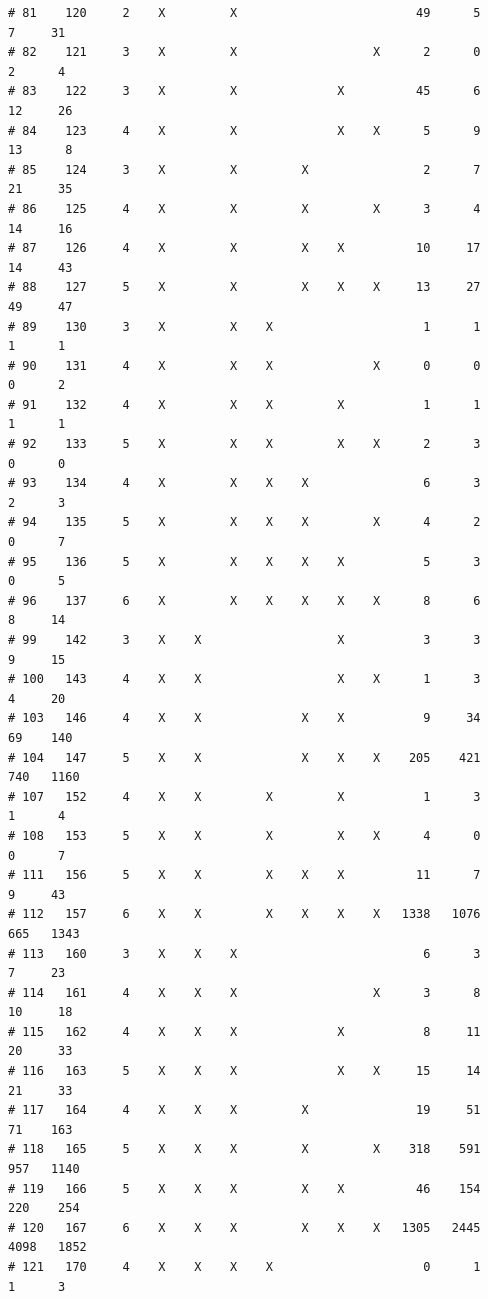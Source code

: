 \documentclass{article}\usepackage[]{graphicx}\usepackage[]{color}
\makeatletter
\newenvironment{kframe}{%
 \def\at@end@of@kframe{}%
 \ifinner\ifhmode%
  \def\at@end@of@kframe{\end{minipage}}%
  \begin{minipage}{\columnwidth}%
 \fi\fi%
 \def\FrameCommand##1{\hskip\@totalleftmargin \hskip-\fboxsep
 \colorbox{shadecolor}{##1}\hskip-\fboxsep
     \hskip-\linewidth \hskip-\@totalleftmargin \hskip\columnwidth}%
 \MakeFramed {\advance\hsize-\width
   \@totalleftmargin\z@ \linewidth\hsize
   \@setminipage}}%
 {\par\unskip\endMakeFramed%
 \at@end@of@kframe}
\newenvironment{knitrout}{}{} %
\makeatother
\begin{document}
\begin{knitrout}
\begin{kframe}
\begin{verbatim}
# 81    120     2    X         X                         49      5      7     31
# 82    121     3    X         X                   X      2      0      2      4
# 83    122     3    X         X              X          45      6     12     26
# 84    123     4    X         X              X    X      5      9     13      8
# 85    124     3    X         X         X                2      7     21     35
# 86    125     4    X         X         X         X      3      4     14     16
# 87    126     4    X         X         X    X          10     17     14     43
# 88    127     5    X         X         X    X    X     13     27     49     47
# 89    130     3    X         X    X                     1      1      1      1
# 90    131     4    X         X    X              X      0      0      0      2
# 91    132     4    X         X    X         X           1      1      1      1
# 92    133     5    X         X    X         X    X      2      3      0      0
# 93    134     4    X         X    X    X                6      3      2      3
# 94    135     5    X         X    X    X         X      4      2      0      7
# 95    136     5    X         X    X    X    X           5      3      0      5
# 96    137     6    X         X    X    X    X    X      8      6      8     14
# 99    142     3    X    X                   X           3      3      9     15
# 100   143     4    X    X                   X    X      1      3      4     20
# 103   146     4    X    X              X    X           9     34     69    140
# 104   147     5    X    X              X    X    X    205    421    740   1160
# 107   152     4    X    X         X         X           1      3      1      4
# 108   153     5    X    X         X         X    X      4      0      0      7
# 111   156     5    X    X         X    X    X          11      7      9     43
# 112   157     6    X    X         X    X    X    X   1338   1076    665   1343
# 113   160     3    X    X    X                          6      3      7     23
# 114   161     4    X    X    X                   X      3      8     10     18
# 115   162     4    X    X    X              X           8     11     20     33
# 116   163     5    X    X    X              X    X     15     14     21     33
# 117   164     4    X    X    X         X               19     51     71    163
# 118   165     5    X    X    X         X         X    318    591    957   1140
# 119   166     5    X    X    X         X    X          46    154    220    254
# 120   167     6    X    X    X         X    X    X   1305   2445   4098   1852
# 121   170     4    X    X    X    X                     0      1      1      3

\end{verbatim}
\end{kframe}
\end{knitrout}
\end{document}
